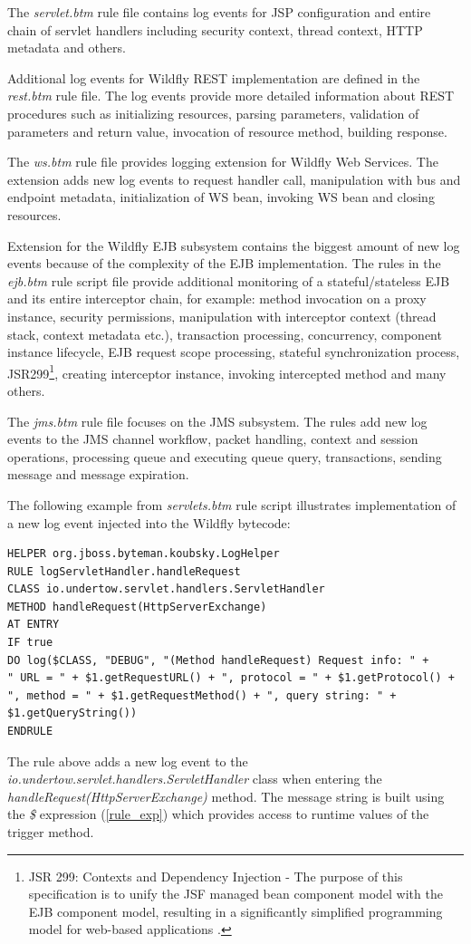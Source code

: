 \documentclass[12pt,oneside]{fithesis2}
\begin{document}
The \textit{servlet.btm} rule file contains log events for JSP configuration and entire chain of servlet handlers including security context, thread context, HTTP metadata and others.

Additional log events for Wildfly REST implementation are defined in the \textit{rest.btm} rule file. The log events provide more detailed information about REST procedures such as initializing resources, parsing parameters, validation of parameters and return value, invocation of resource method, building response.

The \textit{ws.btm} rule file provides logging extension for Wildfly Web Services. The extension adds new log events to request handler call, manipulation with bus and endpoint metadata, initialization of WS bean, invoking WS bean and closing resources.

Extension for the Wildfly EJB subsystem contains the biggest amount of new log events because of the complexity of the EJB implementation. The rules in the \textit{ejb.btm} rule script file provide additional monitoring of a stateful/stateless EJB and its entire interceptor chain, for example: method invocation on a proxy instance, security permissions, manipulation with interceptor context (thread stack, context metadata etc.), transaction processing, concurrency, component instance lifecycle, EJB request scope processing, stateful synchronization process, JSR299\footnote{JSR 299: Contexts and Dependency Injection - The purpose of this specification is to unify the JSF managed bean component model with the EJB component model, resulting in a significantly simplified programming model for web-based applications \cite{jsr299}.}, creating interceptor instance, invoking intercepted method and many others.

The \textit{jms.btm} rule file focuses on the JMS subsystem. The rules add new log events to the JMS channel workflow, packet handling, context and session operations, processing queue and executing queue query, transactions, sending message and message expiration.

The following example from \textit{servlets.btm} rule script illustrates implementation of a new log event injected into the Wildfly bytecode:
\begin{lstlisting}[caption = An example of the rule implementation for a new log event, label = rule_log_example, style=byteman]
HELPER org.jboss.byteman.koubsky.LogHelper
RULE logServletHandler.handleRequest
CLASS io.undertow.servlet.handlers.ServletHandler
METHOD handleRequest(HttpServerExchange)
AT ENTRY
IF true
DO log($CLASS, "DEBUG", "(Method handleRequest) Request info: " + 
" URL = " + $1.getRequestURL() + ", protocol = " + $1.getProtocol() + 
", method = " + $1.getRequestMethod() + ", query string: " + $1.getQueryString())
ENDRULE
\end{lstlisting}
\noindent
The rule above adds a new log event to the \textit{io.undertow.servlet.handlers.ServletHandler} class when entering the \textit{handleRequest(HttpServerExchange)} method. The message string is built using the \textit{\$} expression (\ref{rule_exp}) which provides access to runtime values of the trigger method.
\end{document}
